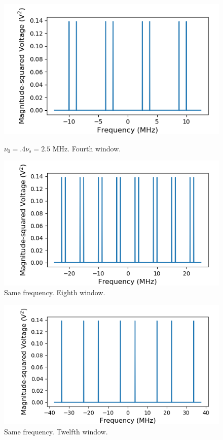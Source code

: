 \documentclass[a4paper]{article}
\begin{document}
\begin{figure}
\centering
\begin{minipage}{.5\textwidth}
	\centering
	\includegraphics[width=.9\linewidth]{5-6/4window}
	\caption{$\nu_0 = .4 \nu_s = 2.5$ MHz. Fourth window.}
	\label{fig:win4}
\end{minipage}%
\begin{minipage}{.5\textwidth}
	\centering
	\includegraphics[width=.9\linewidth]{5-6/8window}
	\caption{Same frequency. Eighth window.}
	\label{fig:win8}
\end{minipage}
\end{figure}

\begin{figure}
\centering
\includegraphics[width=.45\linewidth]{5-6/12window}
\caption{Same frequency. Twelfth window.}
\label{fig:win12}
\end{figure}
\end{document}
